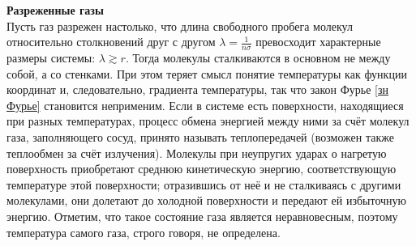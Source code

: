 \documentclass[12pt]{article}
\begin{document}
        \textbf{Разреженные газы}\\
         Пусть газ разрежен настолько, что длина свободного пробега молекул относительно столкновений друг
        с другом $\lambda = \frac{1}{n\sigma}$ превосходит характерные размеры системы: $\lambda \gtrsim r$. Тогда молекулы
        сталкиваются в основном не между собой, а со стенками. При этом теряет смысл понятие
        температуры как функции координат и, следовательно, градиента температуры, так что закон Фурье \ref{зн Фурье}
        становится неприменим. Если в системе есть поверхности, находящиеся при разных температурах, процесс обмена энергией
        между ними за счёт молекул газа, заполняющего сосуд, принято называть теплопередачей (возможен также теплообмен за счёт излучения). Молекулы
        при неупругих ударах о нагретую поверхность приобретают среднюю
        кинетическую энергию, соответствующую температуре этой поверхности;
        отразившись от неё и не сталкиваясь с другими молекулами, они долетают до
        холодной поверхности и передают ей избыточную энергию. Отметим, что такое состояние газа является неравновесным, поэтому
        температура самого газа, строго говоря, не определена.\\
\end{document}
